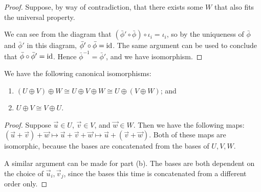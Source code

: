\begin{proof}
    Suppose, by way of contradiction,
    that there exists some \(W\) that also fits the universal property.
    \begin{center}
    \end{center}
    We can see from the diagram that \((\bar{\phi}'\circ\bar{\phi})\circ\iota_i = \iota_i\),
    so by the uniqueness of \(\bar{\phi}\) and \(\bar{\phi}'\) in this diagram,
    \(\bar{\phi}'\circ\bar{\phi} = \operatorname{id}\).
    The same argument can be used to conclude that \(\bar{\phi}\circ\bar{\phi}' = \operatorname{id}\).
    Hence \(\bar{\phi}^{-1} = \bar{\phi}'\),
    and we have isomorphism.
\end{proof}

\begin{proposition}\label{prop:vsp-sum-iso}
    We have the following canonical isomorphisms:
    \begin{enumerate}[label={(\alph*)}, itemsep=0mm]
        \item \((U \oplus V) \oplus W \cong U \oplus V \oplus W \cong U \oplus (V \oplus W)\); and
        \item \(U \oplus V \cong V \oplus U\).
    \end{enumerate}
\end{proposition}
\begin{proof}
    Suppose \(\vec{u} \in U\), \(\vec{v} \in V\), and \(\vec{w} \in W\).
    Then we have the following maps:
    \((\vec{u}+\vec{v})+\vec{w} \mapsto \vec{u}+\vec{v}+\vec{w} \mapsto \vec{u}+(\vec{v}+\vec{w})\).
    Both of these maps are isomorphic,
    because the bases are concatenated from the bases of \(U,V,W\).

    A similar argument can be made for part (b).
    The bases are both dependent on the choice of \(\vec{u}_i,\vec{v}_j\),
    since the bases this time is concatenated from a different order only.
\end{proof}
    
